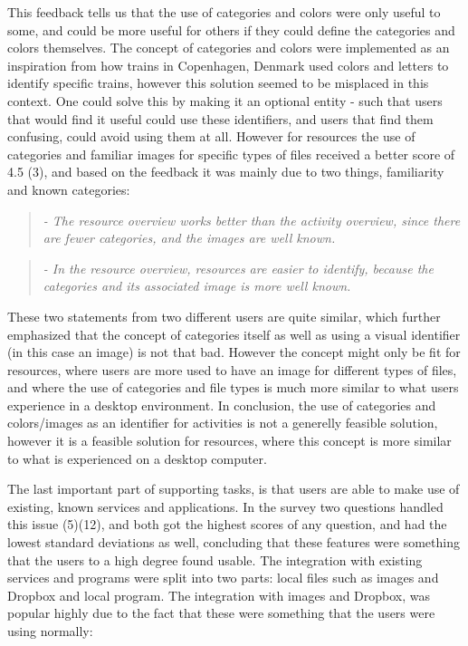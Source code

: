 This feedback tells us that the use of categories and colors were only useful to some, and could be more useful for others if they could define the categories and colors themselves. The concept of categories and colors were implemented as an inspiration from how trains in Copenhagen, Denmark used colors and letters to identify specific trains, however this solution seemed to be misplaced in this context. One could solve this by making it an optional entity - such that users that would find it useful could use these identifiers, and users that find them confusing, could avoid using them at all. However for resources the use of categories and familiar images for specific types of files received a better score of 4.5 (3), and based on the feedback it was mainly due to two things, familiarity and known categories:

\begin{quotation}
	\emph{
		- The resource overview works better than the activity overview, since there are fewer categories, and the images are well known.
	}
\end{quotation}

\begin{quotation}
	\emph{
		- In the resource overview, resources are easier to identify, because the categories and its associated image is more well known.
	}
\end{quotation}
	
These two statements from two different users are quite similar, which further emphasized that the concept of categories itself as well as using a visual identifier (in this case an image) is not that bad. However the concept might only be fit for resources, where users are more used to have an image for different types of files, and where the use of categories and file types is much more similar to what users experience in a desktop environment. In conclusion, the use of categories and colors/images as an identifier for activities is not a generelly feasible solution, however it is a feasible solution for resources, where this concept is more similar to what is experienced on a desktop computer.

The last important part of supporting tasks, is that users are able to make use of existing, known services and applications. In the survey two questions handled this issue (5)(12), and both got the highest scores of any question, and had the lowest standard deviations as well, concluding that these features were something that the users to a high degree found usable. The integration with existing services and programs were split into two parts: local files such as images and Dropbox and local program. The integration with images and Dropbox, was popular highly due to the fact that these were something that the users were using normally:

